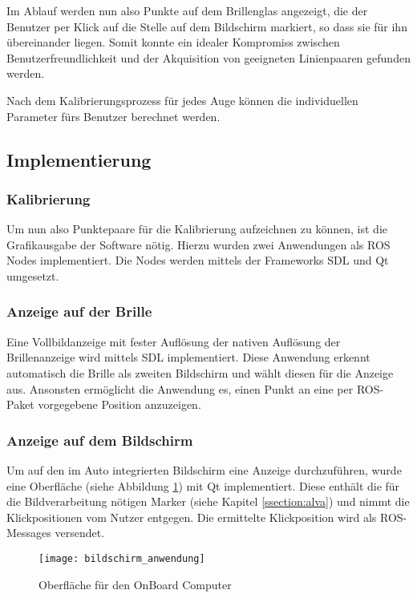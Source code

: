 Im Ablauf werden nun also Punkte auf dem Brillenglas angezeigt, die der Benutzer per Klick auf die Stelle auf dem Bildschirm markiert, so dass sie für ihn übereinander liegen. Somit konnte ein idealer Kompromiss zwischen Benutzerfreundlichkeit und der Akquisition von geeigneten Linienpaaren gefunden werden.

Nach dem Kalibrierungsprozess für jedes Auge können die individuellen Parameter fürs Benutzer berechnet werden.

\subsection{Implementierung}


\subsubsection{Kalibrierung}
\label{chap:punktepaare}
Um nun also Punktepaare für die Kalibrierung aufzeichnen zu können, ist die Grafikausgabe der Software nötig. Hierzu wurden zwei Anwendungen als ROS Nodes implementiert. Die Nodes werden mittels der Frameworks \ac{SDL}  \cite{sdl} und  \ac{Qt} \cite{qt} umgesetzt.
\subsubsection*{Anzeige auf der Brille}
Eine Vollbildanzeige mit fester Auflösung der nativen Auflösung der Brillenanzeige wird mittels SDL implementiert. Diese Anwendung erkennt automatisch die Brille als zweiten Bildschirm und wählt diesen für die Anzeige aus. Ansonsten ermöglicht die Anwendung es, einen Punkt an eine per ROS-Paket vorgegebene Position anzuzeigen.

\subsubsection*{Anzeige auf dem Bildschirm}
Um auf den im Auto integrierten Bildschirm eine Anzeige durchzuführen, wurde eine Oberfläche (siehe Abbildung \ref{fig:fensteranwendung}) mit Qt implementiert. Diese enthält die für die Bildverarbeitung nötigen Marker (siehe Kapitel \ref{ssection:alva}) und nimmt die Klickpositionen vom Nutzer entgegen. Die ermittelte Klickposition wird als ROS-Messages versendet.
\begin{figure}[h]
   \centering
   \texttt{[image: bildschirm\_anwendung]}
   \caption{Oberfläche für den OnBoard Computer}
   \label{fig:fensteranwendung}
\end{figure}


